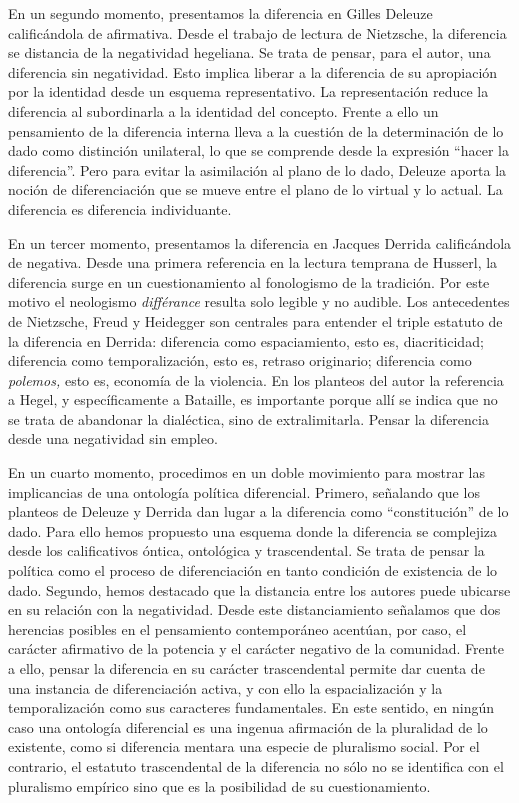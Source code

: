 En un segundo momento, presentamos la diferencia en Gilles Deleuze calificándola de afirmativa. Desde el trabajo de lectura de Nietzsche, la diferencia se distancia de la negatividad hegeliana. Se trata de pensar, para el autor, una diferencia sin negatividad. Esto implica liberar a la diferencia de su apropiación por la identidad desde un esquema representativo. La representación reduce la diferencia al subordinarla a la identidad del concepto. Frente a ello un pensamiento de la diferencia interna lleva a la cuestión de la determinación de lo dado como distinción unilateral, lo que se comprende desde la expresión \enquote{hacer la diferencia}. Pero para evitar la asimilación al plano de lo dado, Deleuze aporta la noción de diferenciación que se mueve entre el plano de lo virtual y lo actual. La diferencia es diferencia individuante.

En un tercer momento, presentamos la diferencia en Jacques Derrida calificándola de negativa. Desde una primera referencia en la lectura temprana de Husserl, la diferencia surge en un cuestionamiento al fonologismo de la tradición. Por este motivo el neologismo \emph{différance} resulta solo legible y no audible. Los antecedentes de Nietzsche, Freud y Heidegger son centrales para entender el triple estatuto de la diferencia en Derrida: diferencia como espaciamiento, esto es, diacriticidad; diferencia como temporalización, esto es, retraso originario; diferencia como \emph{polemos,} esto es, economía de la violencia. En los planteos del autor la referencia a Hegel, y específicamente a Bataille, es importante porque allí se indica que no se trata de abandonar la dialéctica, sino de extralimitarla. Pensar la diferencia desde una negatividad sin empleo.

En un cuarto momento, procedimos en un doble movimiento para mostrar las implicancias de una ontología política diferencial. Primero, señalando que los planteos de Deleuze y Derrida dan lugar a la diferencia como \enquote{constitución} de lo dado. Para ello hemos propuesto una esquema donde la diferencia se complejiza desde los calificativos óntica, ontológica y trascendental. Se trata de pensar la política como el proceso de diferenciación en tanto condición de existencia de lo dado. Segundo, hemos destacado que la distancia entre los autores puede ubicarse en su relación con la negatividad. Desde este distanciamiento señalamos que dos herencias posibles en el pensamiento contemporáneo acentúan, por caso, el carácter afirmativo de la potencia y el carácter negativo de la comunidad. Frente a ello, pensar la diferencia en su carácter trascendental permite dar cuenta de una instancia de diferenciación activa, y con ello la espacialización y la temporalización como sus caracteres fundamentales. En este sentido, en ningún caso una ontología diferencial es una ingenua afirmación de la pluralidad de lo existente, como si diferencia mentara una especie de pluralismo social. Por el contrario, el estatuto trascendental de la diferencia no sólo no se identifica con el pluralismo empírico sino que es la posibilidad de su cuestionamiento.

